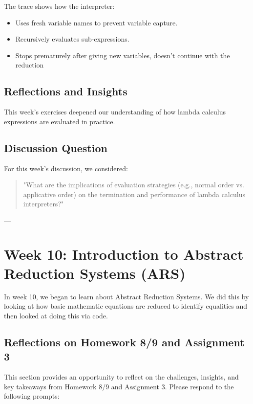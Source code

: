 \documentclass{article}
\begin{document}
The trace shows how the interpreter:

\begin{itemize}
    \item Uses fresh variable names to prevent variable capture.
    \item Recursively evaluates sub-expressions.
    \item Stops prematurely after giving new variables, doesn't continue with the reduction
\end{itemize}


\subsection*{Reflections and Insights}

This week's exercises deepened our understanding of how lambda calculus expressions are evaluated in practice. 

\subsection*{Discussion Question}

For this week's discussion, we considered:

\begin{quote}
\small
"What are the implications of evaluation strategies (e.g., normal order vs. applicative order) on the termination and performance of lambda calculus interpreters?"
\end{quote}

---
\section{Week 10: Introduction to Abstract Reduction Systems (ARS)}
\label{sec:week10}

In week 10, we began to learn about Abstract Reduction Systems. We did this by looking at how basic mathematic equations are reduced to identify equalities and then looked at doing this via code.

\subsection*{Reflections on Homework 8/9 and Assignment 3}

This section provides an opportunity to reflect on the challenges, insights, and key takeaways from Homework 8/9 and Assignment 3. Please respond to the following prompts:
\end{document}
